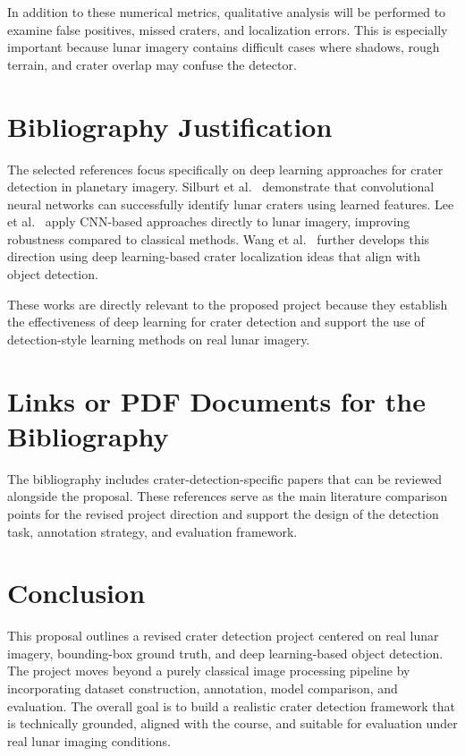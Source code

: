 \documentclass[conference]{IEEEtran}
\begin{document}
	In addition to these numerical metrics, qualitative analysis will be performed to examine false positives, missed craters, and localization errors. This is especially important because lunar imagery contains difficult cases where shadows, rough terrain, and crater overlap may confuse the detector.
	
	\section{Bibliography Justification}
	The selected references focus specifically on deep learning approaches for crater detection in planetary imagery. Silburt et al.~\cite{silburt2019lunar} demonstrate that convolutional neural networks can successfully identify lunar craters using learned features. Lee et al.~\cite{lee2020crater} apply CNN-based approaches directly to lunar imagery, improving robustness compared to classical methods. Wang et al.~\cite{wang2022crater} further develops this direction using deep learning-based crater localization ideas that align with object detection.
	
	These works are directly relevant to the proposed project because they establish the effectiveness of deep learning for crater detection and support the use of detection-style learning methods on real lunar imagery.
	
	\section{Links or PDF Documents for the Bibliography}
	The bibliography includes crater-detection-specific papers that can be reviewed alongside the proposal. These references serve as the main literature comparison points for the revised project direction and support the design of the detection task, annotation strategy, and evaluation framework.
	
	\section{Conclusion}
	This proposal outlines a revised crater detection project centered on real lunar imagery, bounding-box ground truth, and deep learning-based object detection. The project moves beyond a purely classical image processing pipeline by incorporating dataset construction, annotation, model comparison, and evaluation. The overall goal is to build a realistic crater detection framework that is technically grounded, aligned with the course, and suitable for evaluation under real lunar imaging conditions.
	
\end{document}
